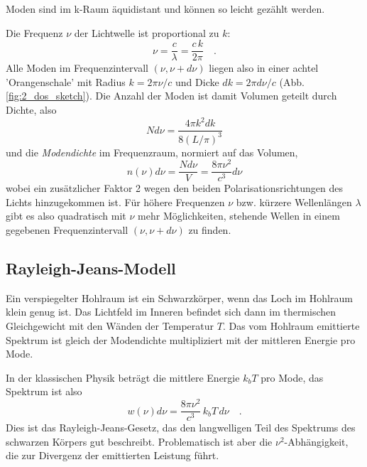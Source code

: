 \begin{marginfigure}
    \caption{Moden sind im k-Raum äquidistant und können so leicht gezählt werden.}
    \label{fig:2_dos_sketch}
\end{marginfigure}

Die Frequenz $\nu$ der Lichtwelle ist proportional zu $k$:
\begin{equation}
    \nu = \frac{c}{\lambda} = \frac{c \, k}{2 \pi } \quad .
\end{equation}
Alle Moden  im  Frequenzintervall $(\nu, \nu+d\nu)$ liegen also in einer  achtel 'Orangenschale' mit Radius $k = 2 \pi \nu / c$  und Dicke $dk = 2 \pi d\nu / c$ (Abb. \ref{fig:2_dos_sketch}). Die Anzahl der Moden ist damit Volumen geteilt durch Dichte, also  
\begin{equation}
    N d\nu = \frac{4 \pi k^2 dk}{8 (L/\pi)^3} 
\end{equation}
und die \emph{Modendichte} im Frequenzraum, normiert auf das Volumen,
\begin{equation}
    n(\nu) d\nu = \frac{N d\nu}{V} = \frac{8 \pi \nu^2}{c^3} d\nu
\end{equation}
wobei ein zusätzlicher Faktor 2 wegen den beiden Polarisationsrichtungen des Lichts hinzugekommen ist. Für höhere Frequenzen $\nu$ bzw. kürzere Wellenlängen $\lambda$ gibt es also quadratisch mit $\nu$ mehr Möglichkeiten, stehende Wellen in einem gegebenen Frequenzintervall $(\nu, \nu+d\nu)$ zu finden. 

\subsection{Rayleigh-Jeans-Modell}

Ein verspiegelter Hohlraum ist ein Schwarzkörper, wenn das Loch im Hohlraum klein genug ist. Das Lichtfeld im Inneren befindet sich dann im thermischen Gleichgewicht mit den Wänden der Temperatur $T$. Das vom Hohlraum emittierte Spektrum ist gleich der Modendichte multipliziert mit der mittleren Energie pro Mode.

In der klassischen Physik beträgt die mittlere Energie $k_b T$ pro Mode, das Spektrum ist also 
\begin{equation}
    w(\nu) d\nu = \frac{8 \pi \nu^2}{c^3} \, k_b T \, d\nu \quad .
\end{equation}
Dies ist das Rayleigh-Jeans-Gesetz, das den langwelligen Teil des Spektrums des schwarzen Körpers gut beschreibt. Problematisch ist aber die $\nu^2$-Abhängigkeit, die zur Divergenz der emittierten Leistung führt.


